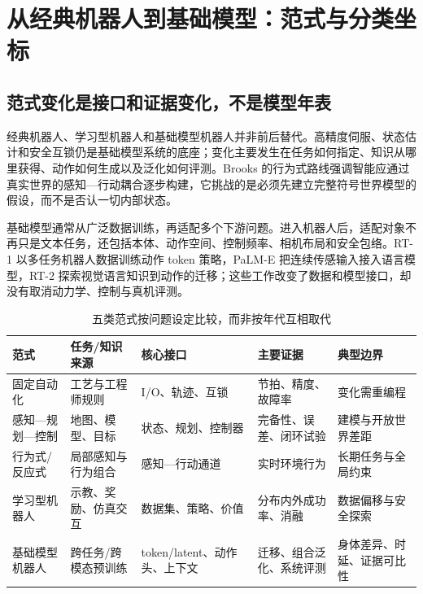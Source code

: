 \chapter{从经典机器人到基础模型：范式与分类坐标}
\label{chap:paradigms-taxonomy}

\section{范式变化是接口和证据变化，不是模型年表}

经典机器人、学习型机器人和基础模型机器人并非前后替代。高精度伺服、状态估计和安全互锁仍是基础模型系统的底座；变化主要发生在任务如何指定、知识从哪里获得、动作如何生成以及泛化如何评测。Brooks 的行为式路线强调智能应通过真实世界的感知—行动耦合逐步构建\cite{brooks1991representation}，它挑战的是必须先建立完整符号世界模型的假设，而不是否认一切内部状态。

基础模型通常从广泛数据训练，再适配多个下游问题\cite{bommasani2021foundation}。进入机器人后，适配对象不再只是文本任务，还包括本体、动作空间、控制频率、相机布局和安全包络。RT-1 以多任务机器人数据训练动作 token 策略\cite{brohan2022rt1}，PaLM-E 把连续传感输入接入语言模型\cite{driess2023palme}，RT-2 探索视觉语言知识到动作的迁移\cite{brohan2023rt2}；这些工作改变了数据和模型接口，却没有取消动力学、控制与真机评测。

\begin{table}[H]
\begingroup
{}
\centering
\caption{五类范式按问题设定比较，而非按年代互相取代}
\label{tab:robot-paradigms}
\begin{tabularx}{\textwidth}{p{}YYYY}
\toprule
范式 & 任务/知识来源 & 核心接口 & 主要证据 & 典型边界 \\
\midrule
固定自动化 & 工艺与工程师规则 & I/O、轨迹、互锁 & 节拍、精度、故障率 & 变化需重编程 \\
感知—规划—控制 & 地图、模型、目标 & 状态、规划、控制器 & 完备性、误差、闭环试验 & 建模与开放世界差距 \\
行为式/反应式 & 局部感知与行为组合 & 感知—行动通道 & 实时环境行为 & 长期任务与全局约束 \\
学习型机器人 & 示教、奖励、仿真交互 & 数据集、策略、价值 & 分布内外成功率、消融 & 数据偏移与安全探索 \\
基础模型机器人 & 跨任务/跨模态预训练 & token/latent、动作头、上下文 & 迁移、组合泛化、系统评测 & 身体差异、时延、证据可比性 \\
\bottomrule
\end{tabularx}
\endgroup
\end{table}

